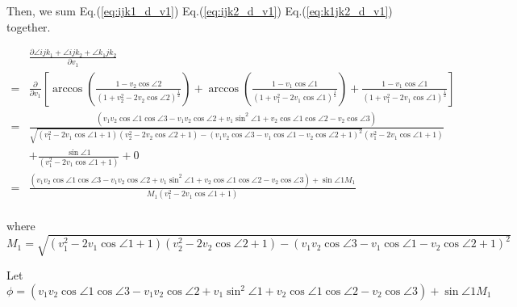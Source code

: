 Then, we sum Eq.(\ref{eq:ijk1_d_v1}) Eq.(\ref{eq:ijk2_d_v1}) Eq.(\ref{eq:k1jk2_d_v1}) together.


\begin{equation}
\begin{aligned}
    &\frac{\partial \angle ijk_1 + \angle ijk_2 + \angle k_1jk_2}{\partial v_1} \\
    =&  
    \frac{\partial }{\partial v_1}[
    \arccos (\frac{1 - v_2\cos\angle2}{{(1+v_2^2-2v_2 \cos\angle2 )^\frac{1}{2}}} ) 
    +
    \arccos (\frac{1 - v_1\cos\angle1}{{(1+v_1^2-2v_1 \cos\angle1 )^\frac{1}{2}}} )
    +
    \frac{1 - v_1\cos\angle1}{{(1 + v_1^2 - 2v_1\cos\angle1 )^\frac{1}{2}}} ]\\
    =&
    \frac
    {
      \left(
        v_1 v_2 \cos{\angle{1} } \cos{\angle{3} } 
        -
        v_1 v_2 \cos{\angle{2} } 
        + 
        v_1 \sin^{2}{\angle{1} } 
        +
        v_2 \cos{\angle{1} } \cos{\angle{2} } 
        -
        v_2 \cos{\angle{3} }
      \right)
    }
    {
      \sqrt{
\left(v_1^{2} - 2 v_1 \cos{\angle{1} } + 1\right) 
          \left(v_2^{2} - 2 v_2 \cos{\angle{2} } + 1\right) 
          -
          \left(
            v_1 v_2 \cos{\angle{3} } 
            - 
            v_1 \cos{\angle{1} } 
            - 
            v_2 \cos{\angle{2} } 
            + 
            1
          \right)^{2}
}
      \left(v_1^{2} - 2 v_1 \cos{\angle{1} } + 1\right)
}\\
    &+
    \frac
    { \sin{\angle{1}}}
    {
\left(
        v_1^{2} - 2 v_1 \cos{\angle{1}} + 1
      \right)
    }+0\\
    =&
    \frac
    {
      \left(
        v_1 v_2 \cos{\angle{1} } \cos{\angle{3} } 
        -
        v_1 v_2 \cos{\angle{2} } 
        + 
        v_1 \sin^{2}{\angle{1} } 
        +
        v_2 \cos{\angle{1} } \cos{\angle{2} } 
        -
        v_2 \cos{\angle{3} }
      \right)
      +
      \sin{\angle{1}}
      M_1
    }
    {
      M_1
      \left(v_1^{2} - 2 v_1 \cos{\angle{1} } + 1\right)
}
    \\
  \end{aligned}
\end{equation}

where $M_1=\sqrt{
\left(v_1^{2} - 2 v_1 \cos{\angle{1} } + 1\right) 
    \left(v_2^{2} - 2 v_2 \cos{\angle{2} } + 1\right) 
    -
    \left(
      v_1 v_2 \cos{\angle{3} } 
      - 
      v_1 \cos{\angle{1} } 
      - 
      v_2 \cos{\angle{2} } 
      + 
      1
    \right)^{2}
}$

Let $\phi=      \left(
  v_1 v_2 \cos{\angle{1} } \cos{\angle{3} } 
  -
  v_1 v_2 \cos{\angle{2} } 
  + 
  v_1 \sin^{2}{\angle{1} } 
  +
  v_2 \cos{\angle{1} } \cos{\angle{2} } 
  -
  v_2 \cos{\angle{3} }
\right)
+
\sin{\angle{1}}
M_1$

